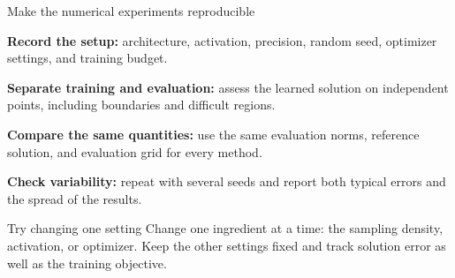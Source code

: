 \renewcommand{\slideid}{L3-PY13}
\begin{frame}[c]{Make the numerical experiments reproducible}
\small
\begin{slideitems}
\item \textbf{Record the setup:} architecture, activation, precision, random
seed, optimizer settings, and training budget.
\item \textbf{Separate training and evaluation:} assess the learned solution
on independent points, including boundaries and difficult regions.
\item \textbf{Compare the same quantities:} use the same evaluation norms,
reference solution, and evaluation grid for every method.
\item \textbf{Check variability:} repeat with several seeds and report both
typical errors and the spread of the results.
\end{slideitems}
\begin{block}{Try changing one setting}
Change one ingredient at a time: the sampling density, activation, or
optimizer. Keep the other settings fixed and track solution error as well
as the training objective.
\end{block}
\end{frame}
